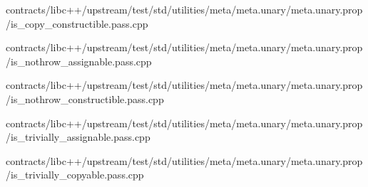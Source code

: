 \begin{DoxyCompactItemize}
contracts/libc++/upstream/test/std/utilities/meta/meta.\+unary/meta.\+unary.\+prop/is\+\_\+copy\+\_\+constructible.\+pass.\+cpp\item 
contracts/libc++/upstream/test/std/utilities/meta/meta.\+unary/meta.\+unary.\+prop/is\+\_\+nothrow\+\_\+assignable.\+pass.\+cpp\item 
contracts/libc++/upstream/test/std/utilities/meta/meta.\+unary/meta.\+unary.\+prop/is\+\_\+nothrow\+\_\+constructible.\+pass.\+cpp\item 
contracts/libc++/upstream/test/std/utilities/meta/meta.\+unary/meta.\+unary.\+prop/is\+\_\+trivially\+\_\+assignable.\+pass.\+cpp\item 
contracts/libc++/upstream/test/std/utilities/meta/meta.\+unary/meta.\+unary.\+prop/is\+\_\+trivially\+\_\+copyable.\+pass.\+cpp\end{DoxyCompactItemize}
